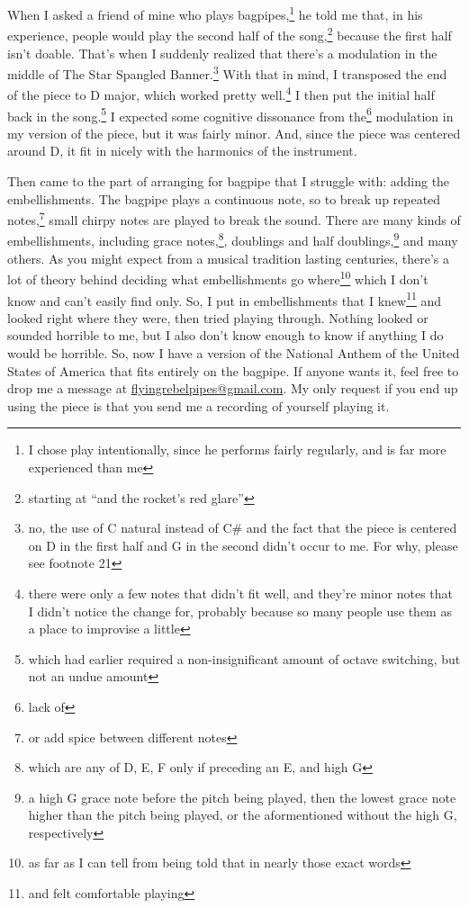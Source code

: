 \documentclass[12pt]{article}[titlepage]
\newcommand{\say}[1]{``#1''}
\newcommand{\1}{\={a}}
\newcommand{\2}{\={e}}
\newcommand{\3}{\={\i}}
\newcommand{\4}{\=o}
\newcommand{\5}{\=u}
\newcommand{\6}{\={A}}
\renewcommand{\,}{\textsuperscript{,}}
\begin{document}
When I asked a friend of mine who plays bagpipes,\footnote{I chose play intentionally, since he performs fairly regularly, and is far more experienced than me} he told me that, in his experience, people would play the second half of the song,\footnote{starting at \say{and the rocket's red glare}} because the first half isn't doable.
That's when I suddenly realized that there's a modulation in the middle of The Star Spangled Banner.\footnote{no, the use of C natural instead of C\# and the fact that the piece is centered on D in the first half and G in the second didn't occur to me. For why, please see footnote 21}
With that in mind, I transposed the end of the piece to D major, which worked pretty well.\footnote{there were only a few notes that didn't fit well, and they're minor notes that I didn't notice the change for, probably because so many people use them as a place to improvise a little}
I then put the initial half back in the song.\footnote{which had earlier required a non-insignificant amount of octave switching, but not an undue amount}
I expected some cognitive dissonance from the\footnote{lack of} modulation in my version of the piece, but it was fairly minor.
And, since the piece was centered around D, it fit in nicely with the harmonics of the instrument.

Then came to the part of arranging for bagpipe that I struggle with: adding the embellishments.
The bagpipe plays a continuous note, so to break up repeated notes,\footnote{or add spice between different notes} small chirpy notes are played to break the sound.
There are many kinds of embellishments, including grace notes,\footnote{which are any of D, E, F only if preceding an E, and high G}, doublings and half doublings,\footnote{a high G grace note before the pitch being played, then the lowest grace note higher than the pitch being played, or the aformentioned without the high G, respectively} and many others.
As you might expect from a musical tradition lasting centuries, there's a lot of theory behind deciding what embellishments go where\footnote{as far as I can tell from being told that in nearly those exact words} which I don't know and can't easily find only.
So, I put in embellishments that I knew\footnote{and felt comfortable playing} and looked right where they were, then tried playing through.
Nothing looked or sounded horrible to me, but I also don't know enough to know if anything I do would be horrible.
So, now I have a version of the National Anthem of the United States of America that fits entirely on the bagpipe.
If anyone wants it, feel free to drop me a message at \href{mailto:flyingrebelpipes@gmail.com}{flyingrebelpipes@gmail.com}.
My only request if you end up using the piece is that you send me a recording of yourself playing it.
\end{document}
